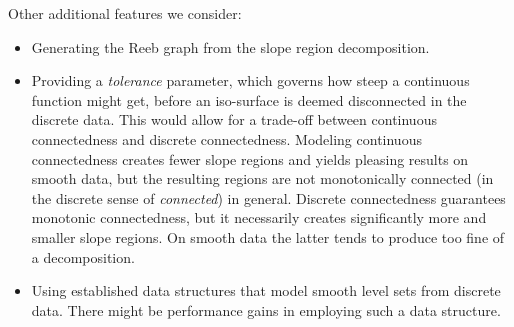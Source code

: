 \documentclass[a4paper,12pt,notitlepage,fullpage]{paper}
\theoremstyle{plain}
\theoremstyle{definition}
\begin{document}
Other additional features we consider:
\begin{itemize}
\item Generating the Reeb graph from the slope region decomposition.
\item Providing a \emph{tolerance} parameter, which governs how steep a continuous function might get, before an iso-surface is deemed disconnected in the discrete data.
This would allow for a trade-off between continuous connectedness and discrete connectedness.
Modeling continuous connectedness creates fewer slope regions and yields pleasing results on smooth data, but the resulting regions are not monotonically connected (in the discrete sense of \emph{connected}) in general.
Discrete connectedness guarantees monotonic connectedness, but it necessarily creates significantly more and smaller slope regions.
On smooth data the latter tends to produce too fine of a decomposition.
\item Using established data structures that model smooth level sets from discrete data. There might be performance gains in employing such a data structure.
\end{itemize}

\end{document}
